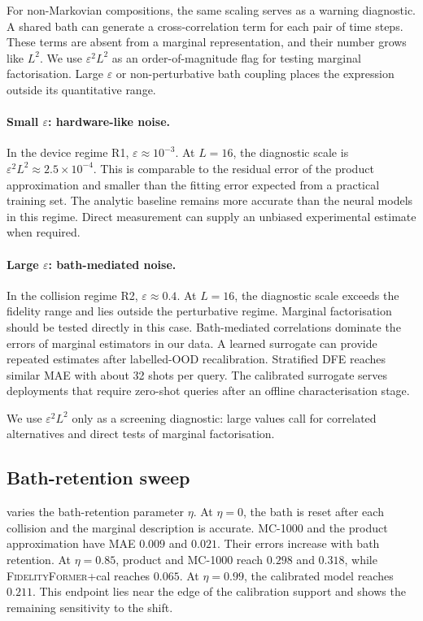 \documentclass[12pt]{iopart}
\newcommand{\eps}{\varepsilon}
\newcommand{\fidno}{\textsc{FidelityFormer}}
\begin{document}
For non-Markovian compositions, the same scaling serves as a warning diagnostic. A shared bath can generate a cross-correlation term for each pair of time steps. These terms are absent from a marginal representation, and their number grows like $L^2$. We use $\eps^2L^2$ as an order-of-magnitude flag for testing marginal factorisation. Large $\eps$ or non-perturbative bath coupling places the expression outside its quantitative range.

\paragraph*{Small $\eps$: hardware-like noise.}
In the device regime R1, $\eps\approx10^{-3}$. At $L=16$, the diagnostic scale is $\eps^2L^2\approx2.5\times10^{-4}$. This is comparable to the residual error of the product approximation and smaller than the fitting error expected from a practical training set. The analytic baseline remains more accurate than the neural models in this regime. Direct measurement can supply an unbiased experimental estimate when required.

\paragraph*{Large $\eps$: bath-mediated noise.}
In the collision regime R2, $\eps\approx0.4$. At $L=16$, the diagnostic scale exceeds the fidelity range and lies outside the perturbative regime. Marginal factorisation should be tested directly in this case. Bath-mediated correlations dominate the errors of marginal estimators in our data. A learned surrogate can provide repeated estimates after labelled-OOD recalibration. Stratified DFE reaches similar MAE with about 32 shots per query. The calibrated surrogate serves deployments that require zero-shot queries after an offline characterisation stage.

We use $\eps^2L^2$ only as a screening diagnostic: large values call for correlated alternatives and direct tests of marginal factorisation.

\subsection{Bath-retention sweep}

 varies the bath-retention parameter $\eta$. At $\eta=0$, the bath is reset after each collision and the marginal description is accurate. MC-1000 and the product approximation have MAE $0.009$ and $0.021$. Their errors increase with bath retention. At $\eta=0.85$, product and MC-1000 reach $0.298$ and $0.318$, while \fidno{}+cal reaches $0.065$. At $\eta=0.99$, the calibrated model reaches $0.211$. This endpoint lies near the edge of the calibration support and shows the remaining sensitivity to the shift.
\end{document}
